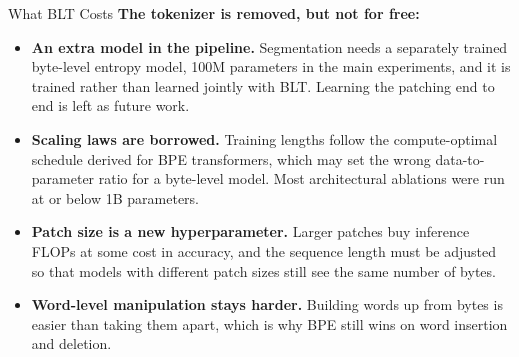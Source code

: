\begin{frame}{What BLT Costs}
    \textbf{The tokenizer is removed, but not for free:}
    \begin{itemize}
        \item \textbf{An extra model in the pipeline.} Segmentation needs a separately trained byte-level entropy model, 100M parameters in the main experiments, and it is trained rather than learned jointly with BLT. Learning the patching end to end is left as future work.
        \item \textbf{Scaling laws are borrowed.} Training lengths follow the compute-optimal schedule derived for BPE transformers, which may set the wrong data-to-parameter ratio for a byte-level model. Most architectural ablations were run at or below 1B parameters.
        \item \textbf{Patch size is a new hyperparameter.} Larger patches buy inference FLOPs at some cost in accuracy, and the sequence length must be adjusted so that models with different patch sizes still see the same number of bytes.
        \item \textbf{Word-level manipulation stays harder.} Building words up from bytes is easier than taking them apart, which is why BPE still wins on word insertion and deletion.
    \end{itemize}
\end{frame}

